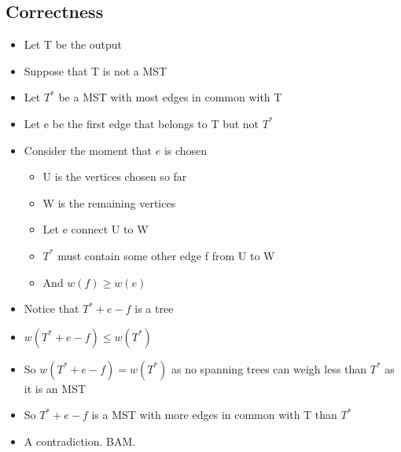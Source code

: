 \documentclass{article}[18pt]
\begin{document}
\subsection{Correctness}
\begin{itemize}
	\item Let T be the output
	\item Suppose that T is not a MST
	\item Let $T^*$ be a MST with most edges in common with T
	\item Let e be the first edge that belongs to T but not $T^*$
	\item Consider the moment that $e$ is chosen
	\begin{itemize}
		\item U is the vertices chosen so far
		\item W is the remaining vertices
		\item Let e connect U to W
		\item $T^*$ must contain some other edge f from U to W
		\item And $w(f)\geqslant w(e)$
	\end{itemize}
	\item Notice that $T^*+e-f$ is a tree
	\item $w(T^*+e-f)\leqslant w(T^*)$
	\item So $w(T^*+e-f)=w(T^*)$ as no spanning trees can weigh less than $T^*$ as it is an MST
	\item So $T^*+e-f$ is a MST with more edges in common with T than $T^*$
	\item A contradiction. BAM.
\end{itemize}
\end{document}
